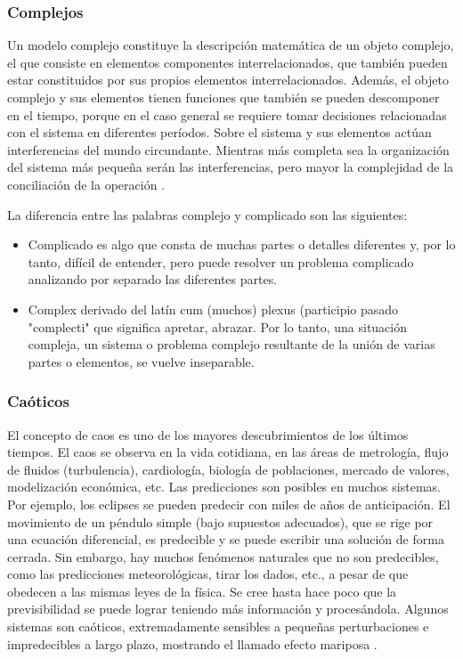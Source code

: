 \documentclass[11pt, letterpaper, spanish]{article}
\begin{document}
{\subsubsection{Complejos}
\par{Un modelo complejo constituye la descripción matemática de un objeto complejo, el que consiste en elementos componentes interrelacionados, que también pueden estar constituidos por sus propios elementos interrelacionados. Además, el objeto complejo y sus elementos tienen funciones que también se pueden descomponer en el tiempo, porque en el caso general se requiere tomar decisiones relacionadas con el sistema en diferentes períodos. Sobre el sistema y sus elementos actúan interferencias del mundo circundante. Mientras más completa sea la organización del sistema más pequeña serán las interferencias, pero mayor la complejidad de la conciliación de la operación \cite{garfinkel_shevtsov_guo_2017}.}
    \par{La diferencia entre las palabras complejo y complicado son las siguientes:
    \begin{itemize}
        \item Complicado es algo que consta de muchas partes o detalles diferentes y, por lo tanto, difícil de entender, pero puede resolver un problema complicado analizando por separado las diferentes partes.
        \item Complex derivado del latín cum (muchos) plexus (participio pasado "complecti" que significa apretar, abrazar. Por lo tanto, una situación compleja, un sistema o problema complejo resultante de la unión de varias partes o elementos, se vuelve inseparable.
    \end{itemize}}

\subsubsection{Caóticos}
    \par{El concepto de caos es uno de los mayores descubrimientos de los últimos tiempos. El caos se observa en la vida cotidiana, en las áreas de metrología, flujo de fluidos (turbulencia), cardiología, biología de poblaciones, mercado de valores, modelización económica, etc. Las predicciones son posibles en muchos sistemas. Por ejemplo, los eclipses se pueden predecir con miles de años de anticipación. El movimiento de un péndulo simple (bajo supuestos adecuados), que se rige por una ecuación diferencial, es predecible y se puede escribir una solución de forma cerrada. Sin embargo, hay muchos fenómenos naturales que no son predecibles, como las predicciones meteorológicas, tirar los dados, etc., a pesar de que obedecen a las mismas leyes de la física. Se cree hasta hace poco que la previsibilidad se puede lograr teniendo más información y procesándola. Algunos sistemas son caóticos, extremadamente sensibles a pequeñas perturbaciones e impredecibles a largo plazo, mostrando el llamado efecto mariposa \cite{garfinkel_shevtsov_guo_2017}.}

}
\end{document}
